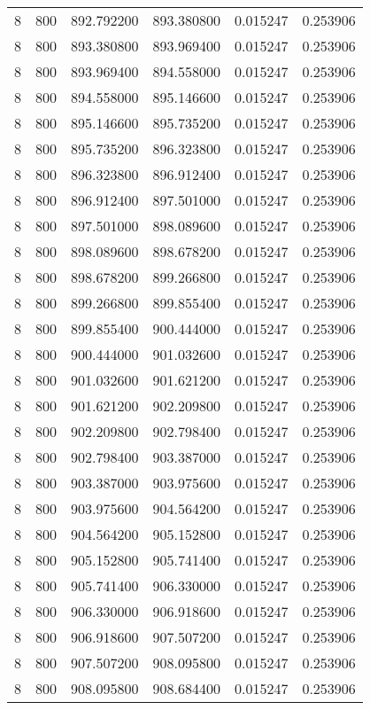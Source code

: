 \begin{longtable}{rrrrrr}
8 & 800 & 892.792200 & 893.380800 & 0.015247 & 0.253906 \\
8 & 800 & 893.380800 & 893.969400 & 0.015247 & 0.253906 \\
8 & 800 & 893.969400 & 894.558000 & 0.015247 & 0.253906 \\
8 & 800 & 894.558000 & 895.146600 & 0.015247 & 0.253906 \\
8 & 800 & 895.146600 & 895.735200 & 0.015247 & 0.253906 \\
8 & 800 & 895.735200 & 896.323800 & 0.015247 & 0.253906 \\
8 & 800 & 896.323800 & 896.912400 & 0.015247 & 0.253906 \\
8 & 800 & 896.912400 & 897.501000 & 0.015247 & 0.253906 \\
8 & 800 & 897.501000 & 898.089600 & 0.015247 & 0.253906 \\
8 & 800 & 898.089600 & 898.678200 & 0.015247 & 0.253906 \\
8 & 800 & 898.678200 & 899.266800 & 0.015247 & 0.253906 \\
8 & 800 & 899.266800 & 899.855400 & 0.015247 & 0.253906 \\
8 & 800 & 899.855400 & 900.444000 & 0.015247 & 0.253906 \\
8 & 800 & 900.444000 & 901.032600 & 0.015247 & 0.253906 \\
8 & 800 & 901.032600 & 901.621200 & 0.015247 & 0.253906 \\
8 & 800 & 901.621200 & 902.209800 & 0.015247 & 0.253906 \\
8 & 800 & 902.209800 & 902.798400 & 0.015247 & 0.253906 \\
8 & 800 & 902.798400 & 903.387000 & 0.015247 & 0.253906 \\
8 & 800 & 903.387000 & 903.975600 & 0.015247 & 0.253906 \\
8 & 800 & 903.975600 & 904.564200 & 0.015247 & 0.253906 \\
8 & 800 & 904.564200 & 905.152800 & 0.015247 & 0.253906 \\
8 & 800 & 905.152800 & 905.741400 & 0.015247 & 0.253906 \\
8 & 800 & 905.741400 & 906.330000 & 0.015247 & 0.253906 \\
8 & 800 & 906.330000 & 906.918600 & 0.015247 & 0.253906 \\
8 & 800 & 906.918600 & 907.507200 & 0.015247 & 0.253906 \\
8 & 800 & 907.507200 & 908.095800 & 0.015247 & 0.253906 \\
8 & 800 & 908.095800 & 908.684400 & 0.015247 & 0.253906 \\

\end{longtable}
